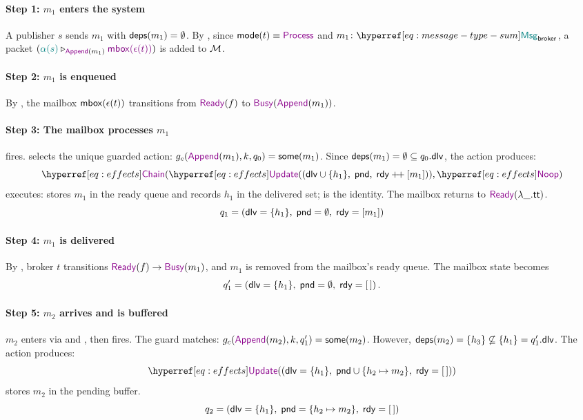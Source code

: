 \documentclass[
  a4paper,        %
  techreport,     %
]{art}
\begin{document}
\paragraph{Step 1: $m_1$ enters the system}
A publisher $s$ sends $m_1$ with $\mathsf{deps}(m_1) = \emptyset$. By
, since $\equal{\mode(t)}{\process}$ and
$\typing{m_1}{\msgtype{\mathsf{broker}}}$, a packet
$\msgpacket{\addr{s}}{\mailboxOf{\enginemap(t)}}{\append(m_1)}$ is added to
$\mathcal{M}$.

\paragraph{Step 2: $m_1$ is enqueued}
By , the mailbox $\mathsf{mbox}(\epsilon(t))$ transitions
from $\ready{f}$ to $\busy{\append(m_1)}$.

\paragraph{Step 3: The mailbox processes $m_1$}
 fires.  selects the unique guarded
action: $\guard{c}(\append(m_1), k, q_0) = \some{m_1}$.
Since $\mathsf{deps}(m_1) = \emptyset \subseteq q_0.\mathsf{dlv}$, the action
produces:
\[
  \chain{%
    \update{(\fdlv \cup \{h_1\},\; \fpnd,\;
             \frdy \pp [m_1])}%
  }{\noop}
\]
 executes:  stores $m_1$ in the ready queue
and records $h_1$ in the delivered set;  is the identity.
The mailbox returns to $\ready{\lambda\_.\mathsf{tt}}$.
\[
  q_1 = (\mathsf{dlv} = \{h_1\},\;
         \mathsf{pnd} = \emptyset,\;
         \mathsf{rdy} = [m_1])
\]

\paragraph{Step 4: $m_1$ is delivered}
By , broker $t$ transitions
$\ready{f} \to \busy{m_1}$, and $m_1$ is removed from the mailbox's ready
queue. The mailbox state becomes
\[
  q_1' = (\mathsf{dlv} = \{h_1\},\;
         \mathsf{pnd} = \emptyset,\;
         \mathsf{rdy} = [\,])\,.
\]

\paragraph{Step 5: $m_2$ arrives and is buffered}
$m_2$ enters via  and , then
 fires. The guard matches: $\guard{c}(\append(m_2), k, q_1')
= \some{m_2}$. However, $\mathsf{deps}(m_2) = \{h_3\} \not\subseteq
\{h_1\} = q_1'.\mathsf{dlv}$. The action produces:
\[
  \update{(\fdlv = \{h_1\},\;
           \fpnd \cup \{h_2 \mapsto m_2\},\;
           \frdy = [\,])}
\]
 stores $m_2$ in the pending buffer.
\[
  q_2 = (\mathsf{dlv} = \{h_1\},\;
         \mathsf{pnd} = \{h_2 \mapsto m_2\},\;
         \mathsf{rdy} = [\,])
\]
\end{document}
